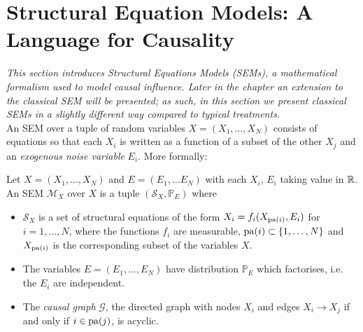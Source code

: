 

\section{Structural Equation Models: A Language for Causality}

\emph{This section introduces Structural Equations Models (SEMs), a mathematical formalism used to model causal influence. Later in the chapter an extension to the classical SEM will be presented; as such, in this section we present classical SEMs in a slightly different way compared to typical treatments.}
\\

\noindent An SEM over a tuple of random variables $X = (X_1, \ldots, X_N)$ consists of equations so that each $X_i$ is written as a function of a subset of the other $X_j$ and an \emph{exogenous noise variable} $E_i$. More formally:

\begin{definition}
Let $X = (X_1, \ldots, X_N)$ and $E = (E_1, \ldots E_N)$ with each $X_i$, $E_i$ taking value in $\mathbb{R}$. An SEM $\mathcal{M}_X$ over $X$ is a tuple $(\mathcal{S}_X, \mathbb{P}_E)$ where
\begin{itemize}
	\item $\mathcal{S}_X$ is a set of structural equations of the form $X_i = f_i(X_{\operatorname{pa}(i)}, E_i)$ for $i=1,\ldots,N$, where the functions $f_i$ are measurable, $\operatorname{pa}(i) \subset \{1,\ldots,N\}$ and $X_{\operatorname{pa}(i)}$ is the corresponding subset of the variables $X$.
	\item The variables $E = (E_1,\ldots,E_N)$ have distribution $\mathbb{P}_E$ which factorises, i.e. the $E_i$ are independent.
	\item The \emph{causal graph} $\mathcal{G}$, the directed graph with nodes $X_i$ and edges $X_i \to X_j$ if and only if $i \in \operatorname{pa}(j)$, is acyclic.
\end{itemize}
\end{definition}

